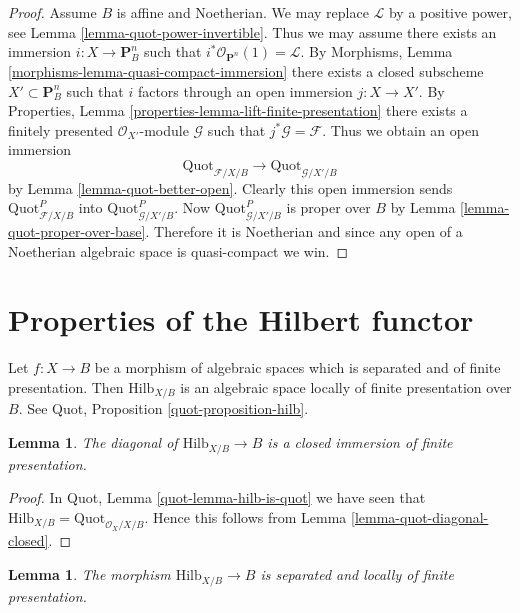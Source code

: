 \documentclass{stacks-project}
\theoremstyle{plain}
\newtheorem{lemma}[subsection]{Lemma}
\theoremstyle{definition}
\theoremstyle{remark}
\numberwithin{equation}{subsection}
\def\Quotfunctor{\mathrm{Quot}}
\def\Hilbfunctor{\mathrm{Hilb}}
\begin{document}
\begin{proof}
\medskip\noindent
Assume $B$ is affine and Noetherian. We may replace $\mathcal{L}$
by a positive power, see Lemma \ref{lemma-quot-power-invertible}.
Thus we may assume there exists an immersion $i : X \to \mathbf{P}^n_B$
such that $i^*\mathcal{O}_{\mathbf{P}^n}(1) = \mathcal{L}$. By
Morphisms, Lemma \ref{morphisms-lemma-quasi-compact-immersion}
there exists a closed subscheme $X' \subset \mathbf{P}^n_B$
such that $i$ factors through an open immersion $j : X \to X'$.
By Properties, Lemma \ref{properties-lemma-lift-finite-presentation}
there exists a finitely presented $\mathcal{O}_{X'}$-module
$\mathcal{G}$ such that $j^*\mathcal{G} = \mathcal{F}$.
Thus we obtain an open immersion
$$
\Quotfunctor_{\mathcal{F}/X/B}
\longrightarrow
\Quotfunctor_{\mathcal{G}/X'/B}
$$
by Lemma \ref{lemma-quot-better-open}. Clearly this open immersion
sends $\Quotfunctor^P_{\mathcal{F}/X/B}$ into
$\Quotfunctor^P_{\mathcal{G}/X'/B}$. Now
$\Quotfunctor^P_{\mathcal{G}/X'/B}$ is proper over $B$ by
Lemma \ref{lemma-quot-proper-over-base}.
Therefore it is Noetherian and since any open of a Noetherian
algebraic space is quasi-compact we win.
\end{proof}




\section{Properties of the Hilbert functor}
\label{section-hilb}

\noindent
Let $f : X \to B$ be a morphism of algebraic spaces which is
separated and of finite presentation. Then
$\Hilbfunctor_{X/B}$ is an algebraic space locally of finite
presentation over $B$. See Quot, Proposition \ref{quot-proposition-hilb}.

\begin{lemma}
\label{lemma-hilb-diagonal-closed}
The diagonal of $\Hilbfunctor_{X/B} \to B$ is a closed immersion
of finite presentation.
\end{lemma}

\begin{proof}
In Quot, Lemma \ref{quot-lemma-hilb-is-quot} we have seen that
$\Hilbfunctor_{X/B} = \Quotfunctor_{\mathcal{O}_X/X/B}$.
Hence this follows from Lemma \ref{lemma-quot-diagonal-closed}.
\end{proof}

\begin{lemma}
\label{lemma-hilb-s-lfp}
The morphism $\Hilbfunctor_{X/B} \to B$ is separated
and locally of finite presentation.
\end{lemma}
\end{document}
